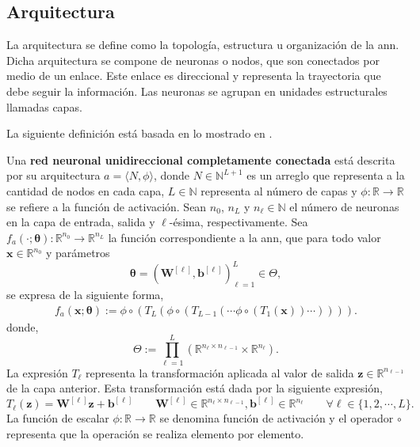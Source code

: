 \subsection{Arquitectura}
\label{sec:ann_architecture}
La arquitectura se define como la topología, estructura u organización de la \acrshort{ann}. Dicha arquitectura se compone de neuronas o nodos, que son conectados por medio de un enlace. Este enlace es direccional y representa la trayectoria que debe seguir la información. Las neuronas se agrupan en unidades estructurales llamadas capas. \cite{Goodfellow-et-al-2016}

La siguiente definición está basada en lo mostrado en \cite{Roberts2022}.

\begin{definition}
\label{def:ANN}
Una \textbf{red neuronal unidireccional completamente conectada} está descrita por su arquitectura $a = \langle N, \phi \rangle$, donde $N \in \mathbb{N}^{L+1}$ es un arreglo que representa a la cantidad de nodos en cada capa, $L \in \mathbb{N}$ representa al número de capas y $\phi : \mathbb{R} \rightarrow \mathbb{R}$ se refiere a la función de activación. Sean $n_0$, $n_L$ y $n_{\ell} \in \mathbb{N}$ el número de neuronas en la capa de entrada, salida y $\ell$-ésima, respectivamente. Sea $f_a(\cdot ;\bm{\theta}): \mathbb{R}^{n_0} \rightarrow \mathbb{R}^{n_L}$ la función correspondiente a la \acrshort{ann}, que para todo valor $\mathbf{x} \in \mathbb{R}^{n_0}$ y parámetros
$$
\bm{\theta} = \left(\mathbf{W}^{[\ell]}, \mathbf{b}^{[\ell]}\right)_{\ell =1}^{L} \in \Theta,
$$
se expresa de la siguiente forma,
\begin{align}
f_a(\textbf{x}; \bm{\theta}) := \phi\circ(T_{L}(\phi\circ(T_{L-1}(\cdots \phi\circ(T_1(\mathbf{x})) \cdots)))).
\label{eq:ANN}
\end{align}
donde,
$$
\Theta := \prod_{\ell=1}^{L}
\left(
\mathbb{R}^{n_{\ell}\times n_{\ell-1}} \times \mathbb{R}^{n_{\ell}}
\right).
$$
 La expresión $T_{\ell}$ representa la transformación aplicada al valor de salida $\mathbf{z} \in \mathbb{R}^{n_{
 \ell -1}}$ de la capa anterior.
 Esta transformación está dada por la siguiente expresión,
$$T_{\ell}(\mathbf{z}) = \mathbf{W}^{[\ell]}\mathbf{z} + \mathbf{b}^{[\ell]} \qquad \mathbf{W}^{[\ell]} \in \mathbb{R}^{n_{\ell} \times n_{\ell -1}}, \mathbf{b}^{[\ell]} \in \mathbb{R}^{n_{\ell}} \qquad \forall \ell \in \{1, 2, \cdots, L\}.$$
La función de escalar $\phi: \mathbb{R} \rightarrow \mathbb{R}$ se denomina función de activación y el operador $\circ$ representa que la operación se realiza elemento por elemento.
\end{definition}
